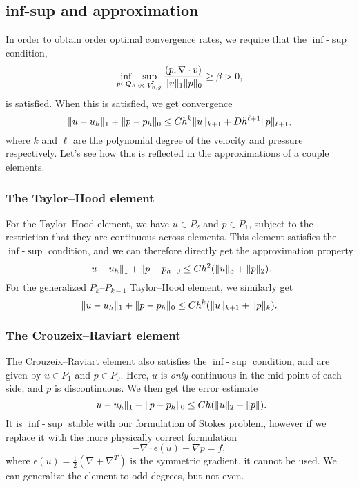 \subsection{inf-sup and approximation}
In order to obtain order optimal convergence rates, we require that the $\inf$-$\sup$ condition,
\begin{equation}
    \inf_{p \in Q_h} \sup_{v \in V_{h, g}} \frac{(p, \nabla \cdot v)}{\lVert v\rVert_1 \lVert p\rVert_0}
    \geq \beta
    > 0,
\end{equation}
is satisfied.
When this is satisfied, we get convergence
\begin{equation}
    \lVert u - u_h\rVert_1 + \lVert p - p_h\rVert_0
    \leq C h^k \lVert u\rVert_{k+1} + D h^{\ell + 1} \lVert p\rVert_{\ell + 1},
\end{equation}
where $k$ and $\ell$ are the polynomial degree of the velocity and pressure respectively.
Let's see how this is reflected in the approximations of a couple elements.

\subsubsection{The Taylor--Hood element} %
For the Taylor--Hood element, we have $u \in P_2$ and $p \in P_1$, subject to the restriction that they are continuous across elements. %
This element satisfies the $\inf$-$\sup$ condition, and we can therefore directly get the approximation property
\begin{equation}
    \lVert u - u_h\rVert_1 + \lVert p - p_h\rVert_0
    \leq C h^2 (\lVert u\rVert_3 + \lVert p\rVert_2).
\end{equation}
For the generalized $P_{k}$--$P_{k-1}$ Taylor--Hood element, we similarly get %
\begin{equation}
    \lVert u - u_h\rVert_1 + \lVert p - p_h\rVert_0
    \leq C h^k (\lVert u\rVert_{k+1} + \lVert p\rVert_k).
\end{equation}

\subsubsection{The Crouzeix--Raviart element} %
The Crouzeix--Raviart element also satisfies the $\inf$-$\sup$ condition, and are given by $u \in P_1$ and $p \in P_0$. %
Here, $u$ is \emph{only} continuous in the mid-point of each side, and $p$ is discontinuous.
We then get the error estimate
\begin{equation}
    \lVert u - u_h\rVert_1 + \lVert p - p_h\rVert_0
    \leq C h (\lVert u\rVert_2 + \lVert p\rVert).
\end{equation}
It is $\inf$-$\sup$ stable with our formulation of Stokes problem, however if we replace it with the more physically correct formulation
\begin{equation}
    -\nabla \cdot \epsilon(u) - \nabla p = f,
\end{equation}
where $\epsilon(u) = \frac{1}{2} (\nabla + \nabla^T)$ is the symmetric gradient, it cannot be used.
We can generalize the element to odd degrees, but not even.

